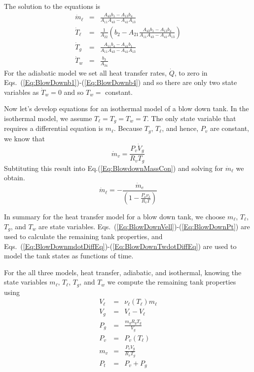 The solution to the equations is
%
\begin{eqnarray}
  \dot{m}_\ell &=& \frac{A_{43} b_{1}-A_{13} b_{4}}{A_{11} A_{43}-A_{41} A_{13}} \label{Eq:BlowDownmdotDiffEq}\\
  \dot{T}_\ell &=& \frac{1}{A_{22}}\left( b_2 -  A_{21} \frac{A_{43} b_{1}-A_{13} b_{4}}{A_{11} A_{43}-A_{41} A_{13}}\right)\\
  \dot{T}_g &=& \frac{A_{11} b_{4} - A_{41} b_{1}}{A_{11} A_{43}-A_{41} A_{13}}\\
  \dot{T}_w &=& \frac{b_3}{A_{34}} \label{Eq:BlowDownTwdotDiffEq}
\end{eqnarray}
%
For the adiabatic model we set all heat transfer rates, $\dot{Q}$,
to zero in Eqs.~(\ref{Eq:BlowDownb1})-(\ref{Eq:BlowDownb4}) and so
there are only two state variables as $\dot{T}_w = 0$ and so $T_w =$
constant.

Now let's develop equations for an isothermal model of a blow down
tank.  In the isothermal model, we assume $T_\ell = T_g = T_w = T$.
The only state variable that requires a differential equation is
$m_\ell$.  Because $T_g$, $T_\ell$, and hence, $P_v$ are constant,
we know that
%
\begin{equation}
    \dot{m}_v = \frac{P_v \dot{V}_g}{R_v T_g}
\end{equation}
%
Subtituting this result into Eq.(\ref{Eq:BlowdownMassCon}) and
solving for $\dot{m}_\ell$ we obtain.
%
\begin{equation}
    \dot{m}_\ell = -\frac{\dot{m}_e}{\left( 1 - \displaystyle\frac{P_v \nu_\ell}{R_v T}\right)}
\end{equation}


In summary for the heat transfer model for a blow down tank, we
choose $m_\ell$, $T_\ell$, $T_g$, and $T_w$ are state variables.
Eqs.~(\ref{Eq:BlowDownVell})-(\ref{Eq:BlowDownPt}) are used to
calculate the remaining tank properties, and
Eqs.~(\ref{Eq:BlowDownmdotDiffEq})-(\ref{Eq:BlowDownTwdotDiffEq})
are used to model the tank states as functions of time.

For the all three models, heat transfer, adiabatic, and isothermal,
knowing the state variables $m_\ell$, $T_\ell$, $T_g$, and $T_w$ we
compute the remaining tank properties using
%
\begin{eqnarray}
    V_\ell & = &  \nu_\ell(T_\ell)m_\ell  \nonumber \\
    V_g & = &  V_t - V_\ell\nonumber \\
   P_g & = &  \frac{m_g R_g T_g}{V_g}\nonumber \\
   P_v & = &  P_v(T_\ell)\nonumber \\
   m_v & = & \frac{P_v V_g}{R_v T_g}\nonumber \\
   P_t & = &  P_v + P_g \nonumber
\end{eqnarray}

